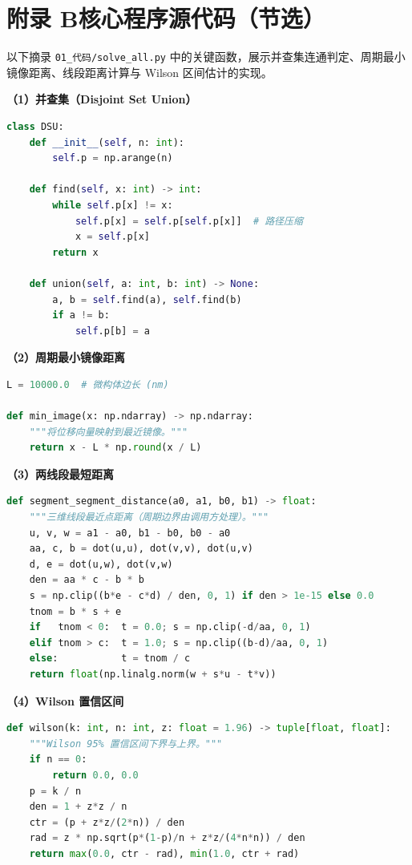 \documentclass[12pt,a4paper,fontset=windows]{ctexart}
\begin{document}
\section*{附录 B\quad 核心程序源代码（节选）}

以下摘录 \texttt{01\_代码/solve\_all.py} 中的关键函数，展示并查集连通判定、周期最小镜像距离、线段距离计算与 Wilson 区间估计的实现。

\textbf{（1）并查集（Disjoint Set Union）}
\begin{lstlisting}[language=Python,basicstyle=\small\ttfamily]
class DSU:
    def __init__(self, n: int):
        self.p = np.arange(n)

    def find(self, x: int) -> int:
        while self.p[x] != x:
            self.p[x] = self.p[self.p[x]]  # 路径压缩
            x = self.p[x]
        return x

    def union(self, a: int, b: int) -> None:
        a, b = self.find(a), self.find(b)
        if a != b:
            self.p[b] = a
\end{lstlisting}

\textbf{（2）周期最小镜像距离}
\begin{lstlisting}[language=Python,basicstyle=\small\ttfamily]
L = 10000.0  # 微构体边长 (nm)

def min_image(x: np.ndarray) -> np.ndarray:
    """将位移向量映射到最近镜像。"""
    return x - L * np.round(x / L)
\end{lstlisting}

\textbf{（3）两线段最短距离}
\begin{lstlisting}[language=Python,basicstyle=\small\ttfamily]
def segment_segment_distance(a0, a1, b0, b1) -> float:
    """三维线段最近点距离（周期边界由调用方处理）。"""
    u, v, w = a1 - a0, b1 - b0, b0 - a0
    aa, c, b = dot(u,u), dot(v,v), dot(u,v)
    d, e = dot(u,w), dot(v,w)
    den = aa * c - b * b
    s = np.clip((b*e - c*d) / den, 0, 1) if den > 1e-15 else 0.0
    tnom = b * s + e
    if   tnom < 0:  t = 0.0; s = np.clip(-d/aa, 0, 1)
    elif tnom > c:  t = 1.0; s = np.clip((b-d)/aa, 0, 1)
    else:           t = tnom / c
    return float(np.linalg.norm(w + s*u - t*v))
\end{lstlisting}

\textbf{（4）Wilson 置信区间}
\begin{lstlisting}[language=Python,basicstyle=\small\ttfamily]
def wilson(k: int, n: int, z: float = 1.96) -> tuple[float, float]:
    """Wilson 95% 置信区间下界与上界。"""
    if n == 0:
        return 0.0, 0.0
    p = k / n
    den = 1 + z*z / n
    ctr = (p + z*z/(2*n)) / den
    rad = z * np.sqrt(p*(1-p)/n + z*z/(4*n*n)) / den
    return max(0.0, ctr - rad), min(1.0, ctr + rad)
\end{lstlisting}
\end{document}
